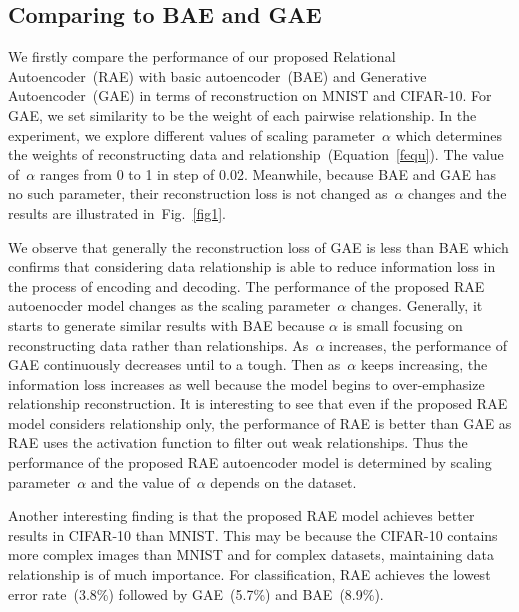 \documentclass[conference]{IEEEtran}
\begin{document}
	\subsection{Comparing to BAE and GAE}
	We firstly compare the performance of our proposed Relational Autoencoder~(RAE) with basic autoencoder~(BAE) and Generative Autoencoder~(GAE) in terms of reconstruction on MNIST and CIFAR-10. For GAE, we set similarity to be the weight of each pairwise relationship. In the experiment, we explore different values of scaling parameter~$\alpha$ which determines the weights of reconstructing data and relationship~(Equation~\ref{fequ}). The value of~$\alpha$ ranges from 0 to 1 in step of 0.02. Meanwhile, because BAE and GAE has no such parameter, their reconstruction loss is not changed as~$\alpha$ changes and the results are illustrated in~Fig.~\ref{fig1}.
	
	We observe that generally the reconstruction loss of GAE is less than BAE which confirms that considering data relationship is able to reduce information loss in the process of encoding and decoding. The performance of the proposed RAE autoenocder model changes as the scaling parameter~$\alpha$ changes. Generally, it starts to generate similar results with BAE because $\alpha$ is small focusing on reconstructing data rather than relationships. As~$\alpha$ increases, the performance of GAE continuously decreases until to a tough. Then as~$\alpha$ keeps increasing, the information loss increases as well because the model begins to over-emphasize relationship reconstruction. It is interesting to see that even if the proposed RAE model considers relationship only, the performance of RAE is better than GAE as RAE uses the activation function to filter out weak relationships. Thus the performance of the proposed RAE autoencoder model is determined by scaling parameter~$\alpha$ and the value of~$\alpha$ depends on the dataset.
	
	Another interesting finding is that the proposed RAE model achieves better results in CIFAR-10 than MNIST. This may be because the CIFAR-10 contains more complex images than MNIST and for complex datasets, maintaining data relationship is of much importance. For classification, RAE achieves the lowest error rate~(3.8\%) followed by GAE~(5.7\%) and BAE~(8.9\%).
	
\end{document}
